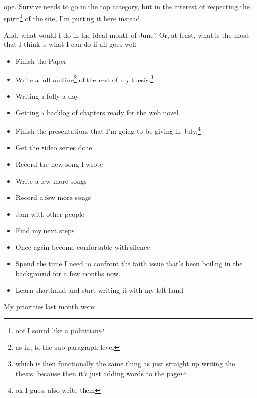 \documentclass[12pt]{article}
\renewcommand{\,}{\textsuperscript{,}}
\begin{document}
ope. Survive needs to go in the top category, but in the interest of respecting the spirit\footnote{oof I sound like a politician} of the site, I'm putting it here instead.

And, what would I do in the ideal month of June?  
Or, at least, what is the most that I think is what I can do if all goes well

\begin{itemize}

\item Finish the Paper

\item Write a full outline\footnote{as in, to the sub-paragraph level} of the rest of my thesis.\footnote{which is then functionally the same thing as just straight up writing the thesis, because then it's just adding words to the page}

\item Writing a folly a day

\item Getting a backlog of chapters ready for the web novel

\item Finish the presentations that I'm going to be giving in July.\footnote{ok I guess also write them}

\item Get the video series done

\item Record the new song I wrote

\item Write a few more songs

\item Record a few more songs

\item Jam with other people

\item Find my next steps

\item Once again become comfortable with silence

\item Spend the time I need to confront the faith issue that's been boiling in the background for a few months now.

\item Learn shorthand and start writing it with my left hand

\end{itemize}

My priorities last month were:
\end{document}
